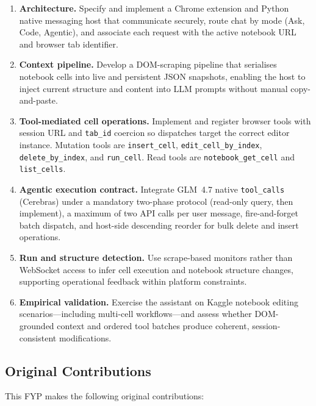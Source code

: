\begin{enumerate}
  \item \textbf{Architecture.} Specify and implement a Chrome extension and Python native messaging host that communicate securely, route chat by mode (Ask, Code, Agentic), and associate each request with the active notebook URL and browser tab identifier.
  \item \textbf{Context pipeline.} Develop a DOM-scraping pipeline that serialises notebook cells into live and persistent JSON snapshots, enabling the host to inject current structure and content into \ac{LLM} prompts without manual copy-and-paste.
  \item \textbf{Tool-mediated cell operations.} Implement and register browser tools with session URL and \texttt{tab\_id} coercion so dispatches target the correct editor instance. Mutation tools are \texttt{insert\_cell}, \texttt{edit\_cell\_by\_index}, \texttt{delete\_by\_index}, and \texttt{run\_cell}. Read tools are \texttt{notebook\_get\_cell} and \texttt{list\_cells}.
  \item \textbf{Agentic execution contract.} Integrate GLM~4.7 native \texttt{tool\_calls} (Cerebras) under a mandatory two-phase protocol (read-only query, then implement), a maximum of two \ac{API} calls per user message, fire-and-forget batch dispatch, and host-side descending reorder for bulk delete and insert operations.
  \item \textbf{Run and structure detection.} Use scrape-based monitors rather than WebSocket access to infer cell execution and notebook structure changes, supporting operational feedback within platform constraints.
  \item \textbf{Empirical validation.} Exercise the assistant on Kaggle notebook editing scenarios---including multi-cell workflows---and assess whether DOM-grounded context and ordered tool batches produce coherent, session-consistent modifications.
\end{enumerate}

\subsection{Original Contributions}
\label{sec:contributions}

This FYP makes the following original contributions:

